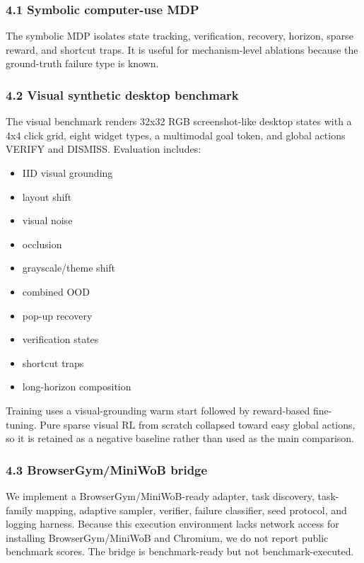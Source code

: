 \documentclass[
]{article}
\providecommand{\tightlist}{%
  \setlength{\itemsep}{0pt}\setlength{\parskip}{0pt}}
\begin{document}
\subsubsection{4.1 Symbolic computer-use
MDP}\label{symbolic-computer-use-mdp}

The symbolic MDP isolates state tracking, verification, recovery,
horizon, sparse reward, and shortcut traps. It is useful for
mechanism-level ablations because the ground-truth failure type is
known.

\subsubsection{4.2 Visual synthetic desktop
benchmark}\label{visual-synthetic-desktop-benchmark}

The visual benchmark renders 32x32 RGB screenshot-like desktop states
with a 4x4 click grid, eight widget types, a multimodal goal token, and
global actions VERIFY and DISMISS. Evaluation includes:

\begin{itemize}
\tightlist
\item
  IID visual grounding
\item
  layout shift
\item
  visual noise
\item
  occlusion
\item
  grayscale/theme shift
\item
  combined OOD
\item
  pop-up recovery
\item
  verification states
\item
  shortcut traps
\item
  long-horizon composition
\end{itemize}

Training uses a visual-grounding warm start followed by reward-based
fine-tuning. Pure sparse visual RL from scratch collapsed toward easy
global actions, so it is retained as a negative baseline rather than
used as the main comparison.

\subsubsection{4.3 BrowserGym/MiniWoB
bridge}\label{browsergymminiwob-bridge}

We implement a BrowserGym/MiniWoB-ready adapter, task discovery,
task-family mapping, adaptive sampler, verifier, failure classifier,
seed protocol, and logging harness. Because this execution environment
lacks network access for installing BrowserGym/MiniWoB and Chromium, we
do not report public benchmark scores. The bridge is benchmark-ready but
not benchmark-executed.
\end{document}
